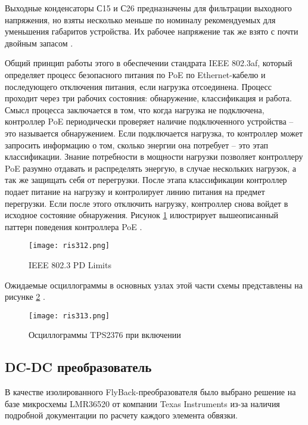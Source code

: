 Выходные конденсаторы С15 и С26 предназначены для фильтрации выходного напряжения, но взяты 
несколько меньше по номиналу рекомендуемых для уменьшения габаритов устройства. Их рабочее
напряжение так же взято с почти двойным запасом \cite{TPS2376:datasheet}.

Общий принцип работы этого в обеспечении стандрата IEEE 802.3af, который определяет 
процесс безопасного питания по PoE по Ethernet-кабелю и последующего отключения питания, 
если нагрузка отсоединена. Процесс проходит через три рабочих состояния: обнаружение, 
классификация и работа. Смысл процесса заключается в том, что когда нагрузка не подключена,
контроллер PoE периодически проверяет наличие подключенного устройства -- это называется 
обнаружением. Если подключается нагрузка, то контроллер может запросить информацию о том,
сколько энергии она потребует -- это этап классификации. Знание потребности в мощности нагрузки 
позволяет контроллеру PoE разумно отдавать и распределять энергую, в случае нескольких нагрузок,
а так же защищать себя от перегрузки. После этапа классификации контроллер подает питание на 
нагрузку и контролирует линию питания на предмет перегрузки. Если после этого отключить нагрузку,
контроллер снова войдет в исходное состояние обнаружения. Рисунок \ref{ris:312}  илюстрирует 
вышеописанный паттерн поведения контроллера PoE \cite{TPS2376:datasheet}.

\begin{figure}[H]
    \centering
    \texttt{[image: ris312.png]}
    \caption{IEEE 802.3 PD Limits}
    \label{ris:312}
\end{figure}

Ожидаемые осциллограммы в основных узлах этой части схемы представлены на рисунке 
\ref{ris:313} \cite{TPS2376:datasheet}.

\begin{figure}[H]
    \centering
    \texttt{[image: ris313.png]}
    \caption{Осциллограммы TPS2376 при включении}
    \label{ris:313}
\end{figure}

\subsection{DC-DC преобразователь}
\hspace{1cm} 

В качестве изолированного FlyBack-преобразователя было выбрано решение на базе микросхемы LMR36520 
от компании Texas Instruments из-за наличия подробной документации по расчету каждого элемента
обвязки. 

